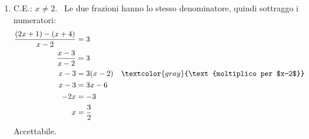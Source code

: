 \begin{question}[ID=3.2, subtitle={Equazioni frazionarie}, difficulty=facile, tags={equazioni frazionarie}]
\begin{explanation}
\begin{enumerate}
    Accettabile.
    \item C.E.: $x\neq2$. \ Le due frazioni hanno lo stesso denominatore, quindi sottraggo i numeratori:
    \[\begin{aligned}
    \dfrac{(2x+1)-(x+4)}{x-2} &= 3\\
    \dfrac{x-3}{x-2} &= 3\\
    x-3 &= 3(x-2) && \textcolor{gray}{\text{moltiplico per $x-2$}}\\
    x-3 &= 3x-6\\
    -2x &= -3\\
    x &= \dfrac32
    \end{aligned}\]
    Accettabile.
\end{enumerate}
\end{explanation}
\end{question}


